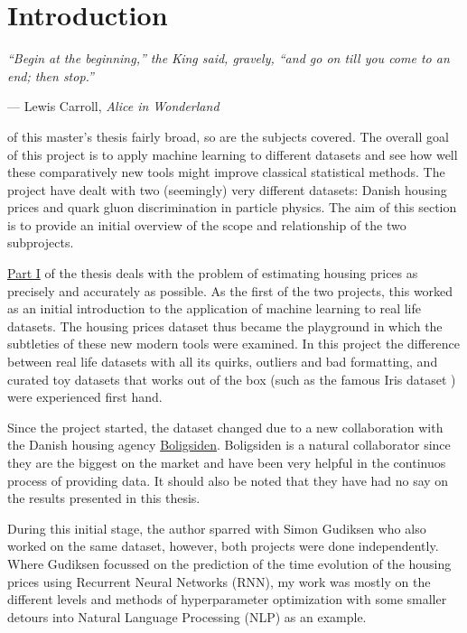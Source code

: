 
\chapter{Introduction}
\label{ch:introduction}
\epigraph{\textit{``Begin at the beginning,'' the King said, gravely, ``and go on till you
come to an end; then stop.''}}{--- Lewis Carroll, \textit{Alice in Wonderland}}


 of this master's thesis fairly broad, so are the subjects covered. The overall goal of this project is to apply machine learning to different datasets and see how well these comparatively new tools might improve classical statistical methods. The project have dealt with two (seemingly) very different datasets: Danish housing prices and quark gluon discrimination in particle physics. The aim of this section is to provide an initial overview of the scope and relationship of the two subprojects.

\hyperref[part1]{Part I} of the thesis deals with the problem of estimating housing prices as precisely and accurately as possible. As the first of the two projects, this worked as an initial introduction to the application of machine learning to real life datasets. The housing prices dataset thus became the playground in which the subtleties of these new modern tools were examined. In this project the difference between real life datasets with all its quirks, outliers and bad formatting, and curated toy datasets that works out of the box (such as the famous Iris dataset \citep{andersonSpeciesProblemIris1936a,fisherUseMultipleMeasurements1936}) were experienced first hand. 

Since the project started, the dataset changed due to a new collaboration with the Danish housing agency \href{www.boligsiden.dk}{Boligsiden}. Boligsiden is a natural collaborator since they are the biggest on the market and have been very helpful in the continuos process of providing data. It should also be noted that they have had no say on the results presented in this thesis. 

During this initial stage, the author sparred with Simon Gudiksen who also worked on the same dataset, however, both projects were done independently. Where Gudiksen focussed on the prediction of the time evolution of the housing prices using Recurrent Neural Networks (RNN), my work was mostly on the different levels and methods of hyperparameter optimization with some smaller detours into Natural Language Processing (NLP) as an example. 

